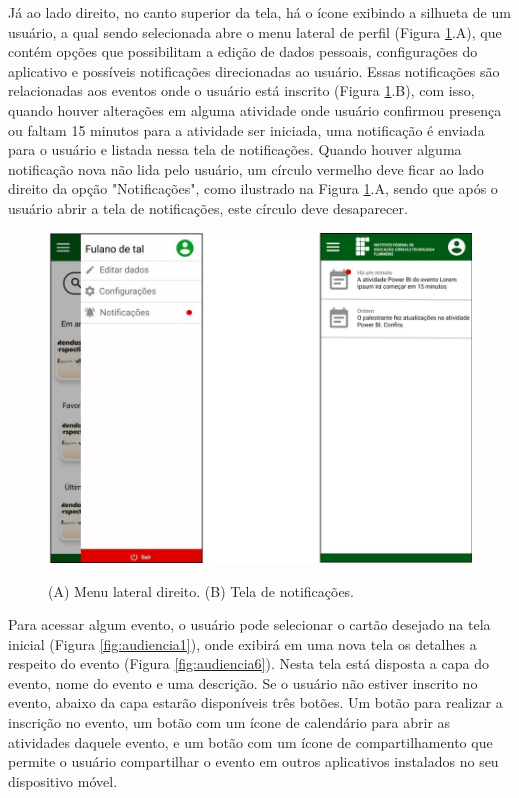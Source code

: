 Já ao lado direito, no canto superior da tela, há o ícone exibindo a silhueta de um usuário, a qual sendo selecionada abre o menu lateral de perfil (Figura \ref{fig:audiencia4}.A), que contém opções que possibilitam a edição de dados pessoais, configurações do aplicativo e possíveis notificações direcionadas ao usuário. Essas notificações são relacionadas aos eventos onde o usuário está inscrito (Figura \ref{fig:audiencia4}.B), com isso, quando houver alterações em alguma atividade onde usuário confirmou presença ou faltam 15 minutos para a atividade ser iniciada, uma notificação é enviada para o usuário e listada nessa tela de notificações. Quando houver alguma notificação nova não lida pelo usuário, um círculo vermelho deve ficar ao lado direito da opção "Notificações", como ilustrado na Figura \ref{fig:audiencia4}.A, sendo que após o usuário abrir a tela de notificações, este círculo deve desaparecer.

\begin{figure}[H]
    \centering
    \caption{(A) Menu lateral direito. (B) Tela de notificações.}
    \includegraphics[scale=0.63]{figuras/Audiencia/4-5.jpg}
    \label{fig:audiencia4}
\end{figure}

Para acessar algum evento, o usuário pode selecionar o cartão desejado na tela inicial (Figura \ref{fig:audiencia1}), onde exibirá em uma nova tela os detalhes a respeito do evento (Figura \ref{fig:audiencia6}). Nesta tela está disposta a capa do evento, nome do evento e uma descrição. Se o usuário não estiver inscrito no evento, abaixo da capa estarão disponíveis três botões. Um botão para realizar a inscrição no evento, um botão com um ícone de calendário para abrir as atividades daquele evento, e um botão com um ícone de compartilhamento que permite o usuário compartilhar o evento em outros aplicativos instalados no seu dispositivo móvel.

